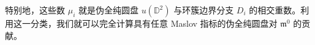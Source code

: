 
特别地，这些数 $\mu_i$ 就是伪全纯圆盘 $u(\mathbb{D}^2)$ 与环簇边界分支 $D_i$ 的相交重数。利用这一分类，我们就可以完全计算具有任意 Maslov 指标的伪全纯圆盘对 $\mathfrak{m}^0$ 的贡献。


